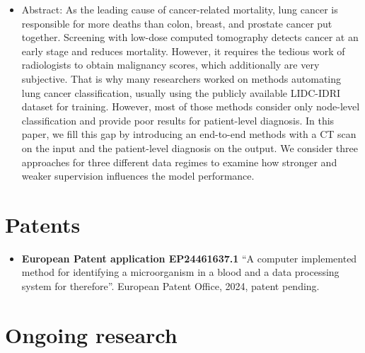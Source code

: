 \begin{itemize}
    Abstract:
    Partial Multi-label Learning (PML) is a type of weakly supervised learning where each training instance corresponds to a set of candidate labels, among which only some are true. In this paper, we introduce ProPML, a novel probabilistic approach to this problem that extends the binary cross entropy to the PML setup. In contrast to existing methods, it does not require suboptimal disambiguation and, as such, can be applied to any deep architecture. Furthermore, experiments conducted on artificial and real-world datasets indicate that ProPML outperforms existing approaches, especially for high noise in a candidate set.
    \item \textbf{}

    Abstract:
    As the leading cause of cancer-related mortality, lung cancer is responsible for more deaths than colon, breast, and prostate cancer put together. Screening with low-dose computed tomography detects cancer at an early stage and reduces mortality. However, it requires the tedious work of radiologists to obtain malignancy scores, which additionally are very subjective. That is why many researchers worked on methods automating lung cancer classification, usually using the publicly available LIDC-IDRI dataset for training. However, most of those methods consider only node-level classification and provide poor results for patient-level diagnosis. In this paper, we fill this gap by introducing an end-to-end methods with a CT scan on the input and the patient-level diagnosis on the output. We consider three approaches for three different data regimes to examine how stronger and weaker supervision influences the model performance.
\end{itemize}

\section{Patents}

\begin{itemize}
    \item \textbf{European Patent application EP24461637.1} ``A computer implemented method for identifying a microorganism in a blood and a data processing system for therefore''. European Patent Office, 2024, patent pending.
\end{itemize}

\section{Ongoing research}

